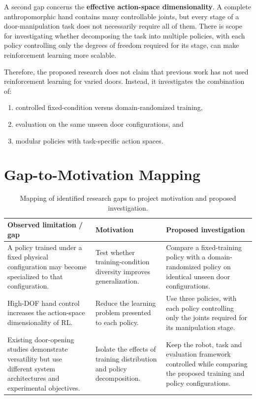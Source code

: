 \documentclass[12pt,a4paper]{report}
\begin{document}
A second gap concerns the \textbf{effective action-space dimensionality}. A complete anthropomorphic hand contains many controllable joints, but every stage of a door-manipulation task does not necessarily require all of them. There is scope for investigating whether decomposing the task into multiple policies, with each policy controlling only the degrees of freedom required for its stage, can make reinforcement learning more scalable.

Therefore, the proposed research does not claim that previous work has not used reinforcement learning for varied doors. Instead, it investigates the combination of:

\begin{enumerate}
    \item controlled fixed-condition versus domain-randomized training,
    \item evaluation on the same unseen door configurations, and
    \item modular policies with task-specific action spaces.
\end{enumerate}

\section{Gap-to-Motivation Mapping}

\begin{table}[h!]
\centering
\small
\begin{tabular}{p{4.2cm} p{4.2cm} p{5.0cm}}
\toprule
\textbf{Observed limitation / gap} & \textbf{Motivation} & \textbf{Proposed investigation} \\
\midrule
A policy trained under a fixed physical configuration may become specialized to that configuration. & Test whether training-condition diversity improves generalization. & Compare a fixed-training policy with a domain-randomized policy on identical unseen door configurations. \\
\midrule
High-DOF hand control increases the action-space dimensionality of RL. & Reduce the learning problem presented to each policy. & Use three policies, with each policy controlling only the joints required for its manipulation stage. \\
\midrule
Existing door-opening studies demonstrate versatility but use different system architectures and experimental objectives. & Isolate the effects of training distribution and policy decomposition. & Keep the robot, task and evaluation framework controlled while comparing the proposed training and policy configurations. \\
\bottomrule
\end{tabular}
\caption{Mapping of identified research gaps to project motivation and proposed investigation.}
\end{table}
\end{document}
